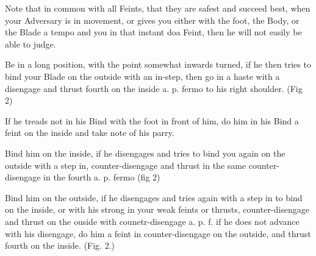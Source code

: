 \newpage


\newpage

\exercise{}
Note that in common with all Feints, that they are safest and succeed
best, when your Adversary is in movement, or gives you either with the
foot, the Body, or the Blade a tempo and you in that instant doa
Feint, then he will not easily be able to judge.

Be in a long position, with the point somewhat inwards turned, if he then tries to bind your Blade on the outside with an in-step, then go in a haste with a disengage and thrust fourth on the inside a. p. fermo to his right shoulder. (Fig 2)

\exercise{}
If he treads not in his Bind with the foot in front of him, do him in
his Bind a feint on the inside and take note of his parry.

\exercise{}
Bind him on the inside, if he disengages and tries to bind you again on the outside with a step in, counter-disengage and thrust in the same counter-disengage in the fourth a. p. fermo (fig 2)

\exercise{}
Bind him on the outside, if he disengages and tries again with a step
in to bind on the inside, or with his strong in your weak feints or
thrusts, counter-disengage and thrust on the ouside with
counetr-disengage a. p. f. if he does not advance with his disengage,
do him a feint in counter-disengage on the outside, and thrust fourth
on the inside. (Fig. 2.)
